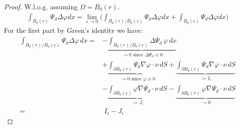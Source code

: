 \begin{proof}
	W.l.o.g. assuming $\Omega = B_0(r)$.
	\begin{align*}
		\int_{B_0(r)} \Psi_d \Delta \varphi dx = \lim_{\epsilon \rightarrow 0}\bigg(  \int_{B_0(r)\slash B_0(\epsilon)} \Psi_d \Delta \varphi dx + \int_{B_0(\epsilon)} \Psi_d \Delta \varphi dx\bigg)
	\end{align*}
	For the first part by Green's identity we have:
	\begin{align*}
		\int_{B_0(r)\slash B_0(\epsilon)} \Psi_d \Delta \varphi \, dx
		=& -\underbrace{\int_{B_0(r)\slash B_0(\epsilon)} \Delta \Psi_d \, \varphi \, dx}_{\rightarrow 0 \text{ since } \Delta \Psi_d \equiv 0} \\
		& + \underbrace{\int_{\partial B_0(r)} \Psi_d \nabla \varphi \cdot \nu \, dS}_{\rightarrow 0 \text{ since } \varphi \equiv 0}
		  + \underbrace{\int_{\partial B_0(\epsilon)} \Psi_d \nabla \varphi \cdot \nu \, dS}_{:= I_\epsilon} \\
		& - \underbrace{\int_{\partial B_0(\epsilon)} \varphi \nabla \Psi_d \cdot \nu \, dS}_{:= J_\epsilon}
		  - \underbrace{\int_{\partial B_0(r)} \varphi \nabla \Psi_d \cdot \nu \, dS}_{\rightarrow 0} \\
		=& \; I_\epsilon - J_\epsilon
	\end{align*}


\end{proof}
